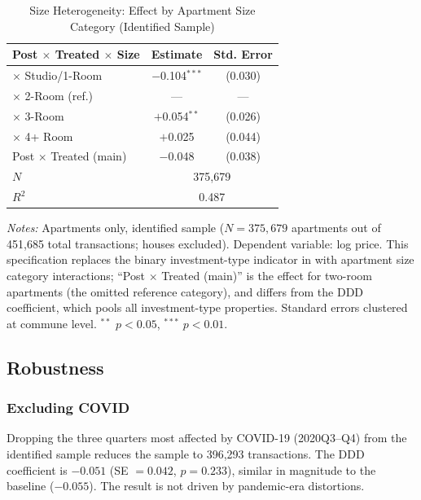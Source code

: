 \documentclass[12pt]{article}
\begin{document}
\begin{table}[H]
\centering
\caption{Size Heterogeneity: Effect by Apartment Size Category (Identified Sample)}
\label{tab:size}
\begin{threeparttable}
\begin{tabular}{lcc}
\toprule
Post $\times$ Treated $\times$ Size & Estimate & Std. Error \\
\midrule
$\times$ Studio/1-Room & $-$0.104$^{***}$ & (0.030) \\
$\times$ 2-Room (ref.) & --- & --- \\
$\times$ 3-Room & $+$0.054$^{**}$ & (0.026) \\
$\times$ 4+ Room & $+$0.025 & (0.044) \\
\midrule
Post $\times$ Treated (main) & $-$0.048 & (0.038) \\
\midrule
$N$ & \multicolumn{2}{c}{375,679} \\
$R^2$ & \multicolumn{2}{c}{0.487} \\
\bottomrule
\end{tabular}
\begin{tablenotes}[flushleft]
\small
\item \emph{Notes:} Apartments only, identified sample ($N = 375{,}679$ apartments out of 451,685 total transactions; houses excluded). Dependent variable: log price. This specification replaces the binary investment-type indicator in  with apartment size category interactions; ``Post $\times$ Treated (main)'' is the effect for two-room apartments (the omitted reference category), and differs from the  DDD coefficient, which pools all investment-type properties. Standard errors clustered at commune level. $^{**}$ $p<0.05$, $^{***}$ $p<0.01$.
\end{tablenotes}
\end{threeparttable}
\end{table}


\subsection{Robustness}

\subsubsection{Excluding COVID}

Dropping the three quarters most affected by COVID-19 (2020Q3--Q4) from the identified sample reduces the sample to 396,293 transactions. The DDD coefficient is $-0.051$ (SE $= 0.042$, $p = 0.233$), similar in magnitude to the baseline ($-0.055$). The result is not driven by pandemic-era distortions.
\end{document}
